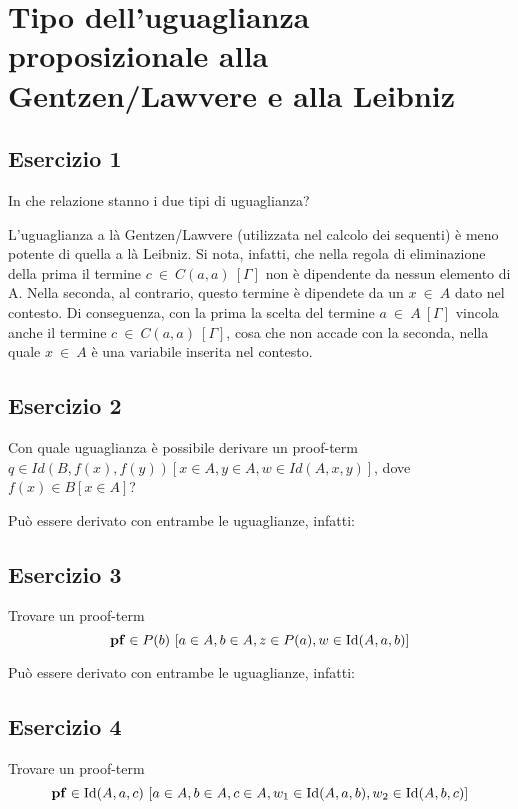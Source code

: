 \newpage
\setcounter{section}{4}
\section{Tipo dell'uguaglianza proposizionale alla Gentzen/Lawvere e alla Leibniz}
\subsection{Esercizio 1}
\begin{thm}
	In che relazione stanno i due tipi di uguaglianza?
\end{thm}
L'uguaglianza a là Gentzen/Lawvere (utilizzata nel calcolo dei sequenti) è meno potente di quella a là Leibniz. Si nota, infatti, che nella regola di eliminazione della prima il termine $c~\in~C(a,a)~[\Gamma]$ non è dipendente da nessun elemento di A. Nella seconda, al contrario, questo termine è dipendete da un $x~\in~A$ dato nel contesto. Di conseguenza, con la prima la scelta del termine $a~\in~A~[\Gamma]$ vincola anche il termine $c~\in~C(a,a)~[\Gamma]$, cosa che non accade con la seconda, nella quale $x~\in~A$ è una variabile inserita nel contesto.

\subsection{Esercizio 2}
\begin{thm}
	Con quale uguaglianza è possibile derivare un proof-term $q\in Id(B, f(x), f(y)) [x\in A, y\in A, w\in Id(A, x, y)]$, dove $f(x)\in B[x\in A]$?
\end{thm}
Può essere derivato con entrambe le uguaglianze, infatti:



\subsection{Esercizio 3}
\begin{thm} Trovare un proof-term
	\[ \mathbf{pf}\in P(b)\ [a\in A, b\in A, z\in P(a), w\in \mathrm{Id}(A, a, b)]\]
\end{thm}
Può essere derivato con entrambe le uguaglianze, infatti:



\subsection{Esercizio 4}
\begin{thm}
	Trovare un proof-term
	\[ \mathbf{pf} \in \mathrm{Id}(A, a, c)\ [a\in A, b\in A, c\in A, w_1 \in \mathrm{Id}(A, a, b), w_2 \in \mathrm{Id}(A, b, c) ] \]
\end{thm}

